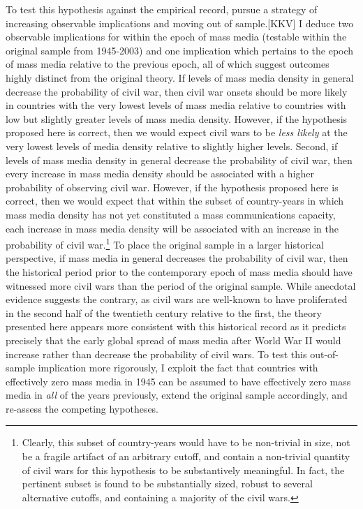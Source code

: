 \documentclass[11pt,article,oneside]{memoir}
\begin{document}
To test this hypothesis against the empirical record, pursue a strategy
of increasing observable implications and moving out of sample.{[}KKV{]}
I deduce two observable implications for within the epoch of mass media
(testable within the original sample from 1945-2003) and one implication
which pertains to the epoch of mass media relative to the previous
epoch, all of which suggest outcomes highly distinct from the original
theory. If levels of mass media density in general decrease the
probability of civil war, then civil war onsets should be more likely in
countries with the very lowest levels of mass media relative to
countries with low but slightly greater levels of mass media density.
However, if the hypothesis proposed here is correct, then we would
expect civil wars to be \emph{less likely} at the very lowest levels of
media density relative to slightly higher levels. Second, if levels of
mass media density in general decrease the probability of civil war,
then every increase in mass media density should be associated with a
higher probability of observing civil war. However, if the hypothesis
proposed here is correct, then we would expect that within the subset of
country-years in which mass media density has not yet constituted a mass
communications capacity, each increase in mass media density will be
associated with an increase in the probability of civil war.\footnote{Clearly,
  this subset of country-years would have to be non-trivial in size, not
  be a fragile artifact of an arbitrary cutoff, and contain a
  non-trivial quantity of civil wars for this hypothesis to be
  substantively meaningful. In fact, the pertinent subset is found to be
  substantially sized, robust to several alternative cutoffs, and
  containing a majority of the civil wars.} To place the original sample
in a larger historical perspective, if mass media in general decreases
the probability of civil war, then the historical period prior to the
contemporary epoch of mass media should have witnessed more civil wars
than the period of the original sample. While anecdotal evidence
suggests the contrary, as civil wars are well-known to have proliferated
in the second half of the twentieth century relative to the first, the
theory presented here appears more consistent with this historical
record as it predicts precisely that the early global spread of mass
media after World War II would increase rather than decrease the
probability of civil wars. To test this out-of-sample implication more
rigorously, I exploit the fact that countries with effectively zero mass
media in 1945 can be assumed to have effectively zero mass media in
\emph{all} of the years previously, extend the original sample
accordingly, and re-assess the competing hypotheses.
\end{document}
